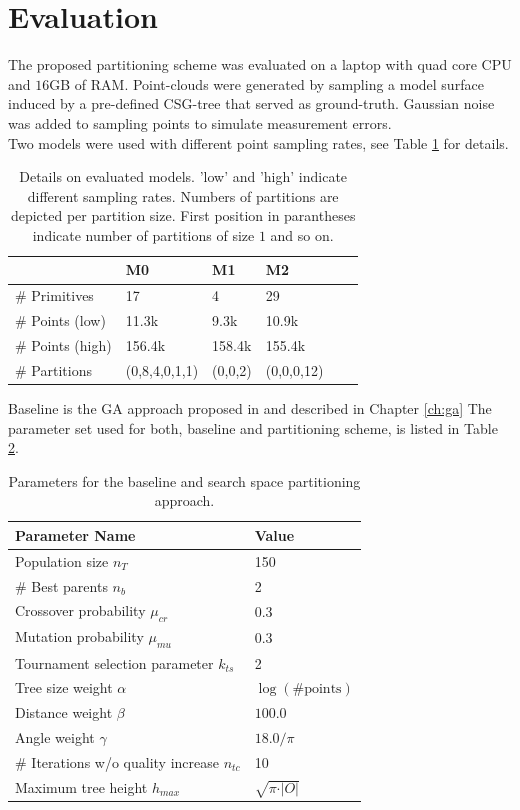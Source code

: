 \section{Evaluation}
\label{ch:eval}
The proposed partitioning scheme was evaluated on a laptop with quad core CPU and $16$GB of RAM.
Point-clouds were generated by sampling a model surface induced by a pre-defined \ac{CSG}-tree that served as ground-truth. Gaussian noise was added to sampling points to simulate measurement errors.
\\
Two models were used with different point sampling rates, see Table \ref{tab::models} for details. 
\begin{table}[h]
	\centering
	\begin{tabular}{|l|l|l|l|l|l|}
	\hline
	 & \textbf{M0} & \textbf{M1} & \textbf{M2} \\
	\hline
	\# Primitives & 17 & 4 & 29 \\
	\hline
	\# Points (low) & 11.3k & 9.3k & 10.9k\\
	\hline
	\# Points (high) & 156.4k & 158.4k & 155.4k\\
	\hline
	\# Partitions & (0,8,4,0,1,1) & (0,0,2) &  (0,0,0,12)\\
	\hline	
	\end{tabular}
	\caption{Details on evaluated models. 'low' and 'high' indicate different sampling rates. Numbers of partitions are depicted per partition size. First position in parantheses indicate number of partitions of size $1$ and so on.}
	\label{tab::models}
\end{table}
Baseline is the \ac{GA} approach proposed in \cite{fayolle2016evolutionary} and described in Chapter \ref{ch:ga} The parameter set used for both, baseline and partitioning scheme, is listed in Table \ref{tab:gaparams}.
\begin{table}[h]
	\centering
	\begin{tabular}{|l|l|}
		\hline
		\textbf{Parameter Name} & \textbf{Value}  \\
		\hline
		Population size $n_T$ & 150 \\
		\hline
		\# Best parents $n_b$ & 2 \\
		\hline
		Crossover probability $\mu_{cr}$& 0.3 \\
		\hline
		Mutation probability $\mu_{mu}$& 0.3 \\
		\hline
		Tournament selection parameter $k_{ts}$ & 2\\
		\hline
		Tree size weight $\alpha$& $\log(\text{\#points})$\\
		\hline
		Distance weight $\beta$& $100.0$ \\
		\hline
		Angle weight $\gamma$& $18.0/\pi$ \\
		\hline 
		\# Iterations w/o quality increase $n_{tc}$ & 10 \\
		\hline 
		Maximum tree height $h_{max}$ & $\sqrt{\pi\cdot \vert O \vert}$ \\
		\hline 
	\end{tabular}
	\caption{Parameters for the baseline and search space partitioning approach.}
	\label{tab:gaparams}
\end{table}
